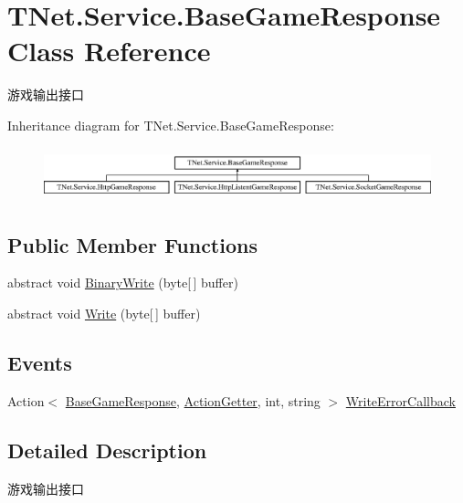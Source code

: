 \hypertarget{class_t_net_1_1_service_1_1_base_game_response}{}\section{T\+Net.\+Service.\+Base\+Game\+Response Class Reference}
\label{class_t_net_1_1_service_1_1_base_game_response}


游戏输出接口  


Inheritance diagram for T\+Net.\+Service.\+Base\+Game\+Response\+:\begin{figure}[H]
\begin{center}
\leavevmode
\includegraphics[height=1.536351cm]{class_t_net_1_1_service_1_1_base_game_response}
\end{center}
\end{figure}
\subsection*{Public Member Functions}
\begin{DoxyCompactItemize}
\item 
abstract void \mbox{\hyperlink{class_t_net_1_1_service_1_1_base_game_response_a1e037de4af1a1fee323cc7efbe9cbc3e}{Binary\+Write}} (byte\mbox{[}$\,$\mbox{]} buffer)
\item 
abstract void \mbox{\hyperlink{class_t_net_1_1_service_1_1_base_game_response_a2ede5b36253063e68dbe5553a95bf1e2}{Write}} (byte\mbox{[}$\,$\mbox{]} buffer)
\end{DoxyCompactItemize}
\subsection*{Events}
\begin{DoxyCompactItemize}
\item 
Action$<$ \mbox{\hyperlink{class_t_net_1_1_service_1_1_base_game_response}{Base\+Game\+Response}}, \mbox{\hyperlink{class_t_net_1_1_service_1_1_action_getter}{Action\+Getter}}, int, string $>$ \mbox{\hyperlink{class_t_net_1_1_service_1_1_base_game_response_a9a7dc8163510f5349af133a98fce8c9c}{Write\+Error\+Callback}}
\end{DoxyCompactItemize}


\subsection{Detailed Description}
游戏输出接口 



